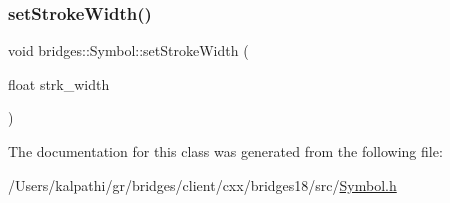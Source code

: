 \mbox{\label{classbridges_1_1_symbol_a29e8e8b80ea1aba0a99abdacd7c8ec17}} 
\subsubsection{\texorpdfstring{set\+Stroke\+Width()}{setStrokeWidth()}}
{\footnotesize\ttfamily void bridges\+::\+Symbol\+::set\+Stroke\+Width (\begin{DoxyParamCaption}\item[{float}]{strk\+\_\+width }\end{DoxyParamCaption})\hspace{0.3cm}{\ttfamily [inline]}}



The documentation for this class was generated from the following file\+:\begin{DoxyCompactItemize}
\item 
/\+Users/kalpathi/gr/bridges/client/cxx/bridges18/src/\mbox{\hyperlink{_symbol_8h}{Symbol.\+h}}\end{DoxyCompactItemize}
